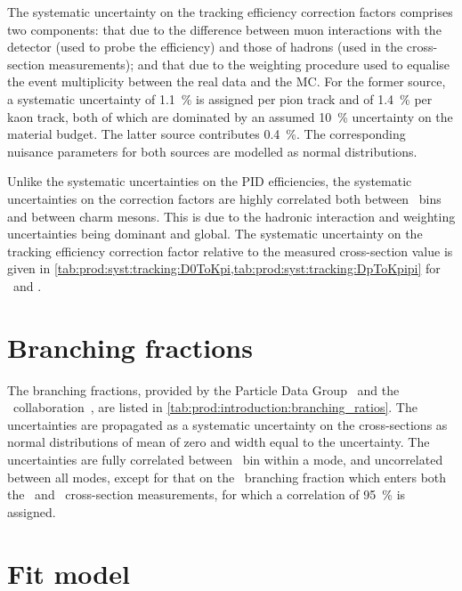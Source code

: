 The systematic uncertainty on the tracking efficiency correction factors
comprises two components: that due to the difference between muon interactions
with the detector (used to probe the efficiency) and those of hadrons (used in
the cross-section measurements); and that due to the weighting procedure used
to equalise the event multiplicity between the real data and the \ac{MC}.
For the former source, a systematic uncertainty of \SI{1.1}{\percent} is
assigned per pion track and of \SI{1.4}{\percent} per kaon track, both of which
are dominated by an assumed \SI{10}{\percent} uncertainty on the material
budget.
The latter source contributes \SI{0.4}{\percent}.
The corresponding nuisance parameters for both sources are modelled as normal
distributions.

Unlike the systematic uncertainties on the \ac{PID} efficiencies, the
systematic uncertainties on the correction factors are highly correlated both
between \pTy\ bins and between charm mesons.
This is due to the hadronic interaction and weighting uncertainties being
dominant and global.
The systematic uncertainty on the tracking efficiency correction factor
relative to the measured cross-section value is given in
\cref{tab:prod:syst:tracking:D0ToKpi,tab:prod:syst:tracking:DpToKpipi} for
\DzToKpi\ and \DpToKpipi.

\section{Branching fractions}
\label{chap:prod:syst:bf}

The branching fractions, provided by the Particle Data Group~\cite{PDG2014} and
the \cleo\ collaboration~\cite{Alexander:2008aa}, are listed in
\cref{tab:prod:introduction:branching_ratios}.
The uncertainties are propagated as a systematic uncertainty on the
cross-sections as normal distributions of mean of zero and width equal to the
uncertainty.
The uncertainties are fully correlated between \pTy\ bin within a mode, and
uncorrelated between all modes, except for that on the \DzToKpi\ branching
fraction which enters both the \DzToKpi\ and \DstToDzpi\ cross-section
measurements, for which a correlation of \SI{95}{\percent} is assigned.

\section{Fit model}
\label{chap:prod:syst:fitting}

